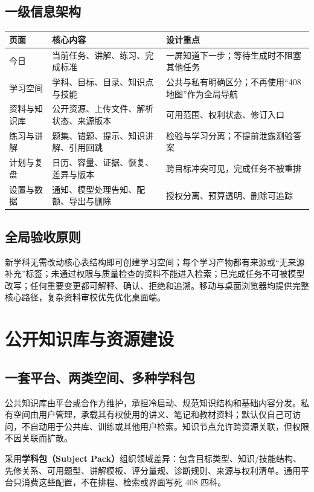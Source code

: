 \documentclass[UTF8,a4paper,11pt,fontset=none]{ctexart}
\newcommand{\cth}[1]{\textbf{\sffamily #1}}
\newcommand{\newsec}[1]{\clearpage\section{#1}}
\newenvironment{tbl}{\par\vspace{3pt}\small\noindent\ignorespaces}{\unskip\par\vspace{5pt}}
\begin{document}
\subsection{一级信息架构}
\begin{tbl}
\begin{tabularx}{\linewidth}{@{}L{24mm}YY@{}}
\toprule
\cth{页面}&\cth{核心内容}&\cth{设计重点}\\\midrule
今日&当前任务、讲解、练习、完成标准&一屏知道下一步；等待生成时不阻塞其他任务\\
学习空间&学科、目标、目录、知识点与技能&公共与私有明确区分；不再使用“408 地图”作为全局导航\\
资料与知识库&公开资源、上传文件、解析状态、来源版本&可用范围、权利状态、修订入口\\
练习与讲解&题集、错题、提示、知识讲解、引用回跳&检验与学习分离；不提前泄露测验答案\\
计划与复盘&日历、容量、证据、恢复、差异与版本&跨目标冲突可见，完成任务不被重排\\
设置与数据&通知、模型处理告知、配额、导出与删除&授权分离、预算透明、删除可追踪\\
\bottomrule
\end{tabularx}
\end{tbl}

\subsection{全局验收原则}
新学科无需改动核心表结构即可创建学习空间；每个学习产物都有来源或“无来源补充”标签；未通过权限与质量检查的资料不能进入检索；已完成任务不可被模型改写；任何重要变更都可解释、确认、拒绝和追溯。移动与桌面浏览器均提供完整核心路径，复杂资料审校优先优化桌面端。

\newsec{公开知识库与资源建设}
\subsection{一套平台、两类空间、多种学科包}
公共知识库由平台或合作方维护，承担冷启动、规范知识结构和基础内容分发。私有空间由用户管理，承载其有权使用的讲义、笔记和教材资料；默认仅自己可访问，不自动用于公共库、训练或其他用户检索。知识节点允许跨资源关联，但权限不因关联而扩散。

采用\textbf{学科包（Subject Pack）}组织领域差异：包含目标类型、知识/技能结构、先修关系、可用题型、讲解模板、评分量规、诊断规则、来源与权利清单。通用平台只消费这些配置，不在排程、检索或界面写死 408 四科。
\end{document}

